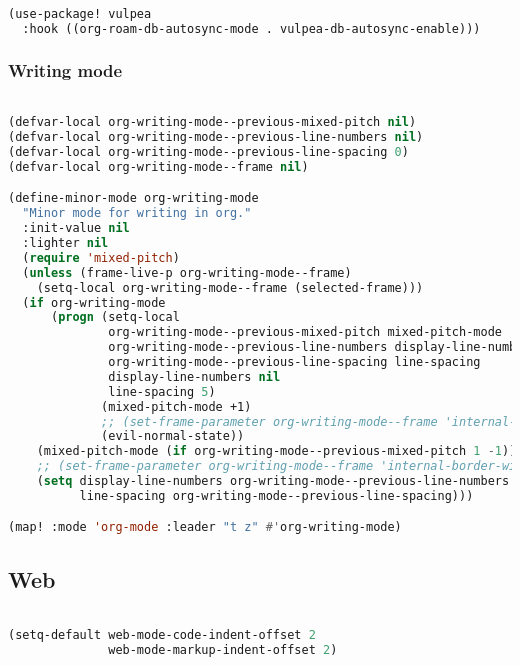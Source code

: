 \documentclass[11pt]{article}
\begin{document}
\begin{lstlisting}[language=Lisp]%! Someone please complete this list for me

(use-package! vulpea
  :hook ((org-roam-db-autosync-mode . vulpea-db-autosync-enable)))
\end{lstlisting}

\subsubsection{Writing mode}
\label{sec:writing-mode}
\begin{lstlisting}[language=Lisp]%! Someone please complete this list for me

(defvar-local org-writing-mode--previous-mixed-pitch nil)
(defvar-local org-writing-mode--previous-line-numbers nil)
(defvar-local org-writing-mode--previous-line-spacing 0)
(defvar-local org-writing-mode--frame nil)

(define-minor-mode org-writing-mode
  "Minor mode for writing in org."
  :init-value nil
  :lighter nil
  (require 'mixed-pitch)
  (unless (frame-live-p org-writing-mode--frame)
    (setq-local org-writing-mode--frame (selected-frame)))
  (if org-writing-mode
      (progn (setq-local
              org-writing-mode--previous-mixed-pitch mixed-pitch-mode
              org-writing-mode--previous-line-numbers display-line-numbers
              org-writing-mode--previous-line-spacing line-spacing
              display-line-numbers nil
              line-spacing 5)
             (mixed-pitch-mode +1)
             ;; (set-frame-parameter org-writing-mode--frame 'internal-border-width 30)
             (evil-normal-state))
    (mixed-pitch-mode (if org-writing-mode--previous-mixed-pitch 1 -1))
    ;; (set-frame-parameter org-writing-mode--frame 'internal-border-width 0)
    (setq display-line-numbers org-writing-mode--previous-line-numbers
          line-spacing org-writing-mode--previous-line-spacing)))

(map! :mode 'org-mode :leader "t z" #'org-writing-mode)
\end{lstlisting}


\subsection{Web}
\label{sec:web}
\begin{lstlisting}[language=Lisp]%! Someone please complete this list for me

(setq-default web-mode-code-indent-offset 2
              web-mode-markup-indent-offset 2)
\end{lstlisting}
\end{document}
